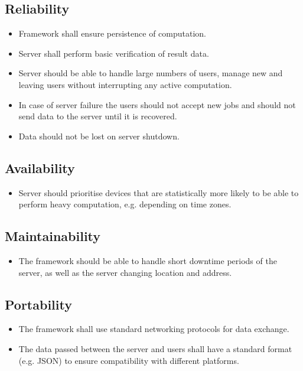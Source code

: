 \documentclass[a4paper,10pt]{article}
\begin{document}
\subsection{Reliability}

\begin{itemize}
	\item Framework shall ensure persistence of computation.
	\item Server shall perform basic verification of result data.
	\item Server should be able to handle large numbers of users, manage new and leaving users without interrupting any active computation.
	\item In case of server failure the users should not accept new jobs and should not send data to the server until it is recovered.
	\item Data should not be lost on server shutdown.
\end{itemize} 

\subsection{Availability}

\begin{itemize}
	\item Server should prioritise devices that are statistically more likely to be able to perform heavy computation, e.g. depending on time zones.

\end{itemize} 

\subsection{Maintainability}

\begin{itemize}
	\item The framework should be able to handle short downtime periods of the server, as well as the server changing location and address.

\end{itemize} 

\subsection{Portability}

\begin{itemize}
	\item The framework shall use standard networking protocols for data exchange.
	\item The data passed between the server and users shall have a standard format (e.g. JSON) to ensure compatibility with different platforms.
\end{itemize} 
\end{document}

